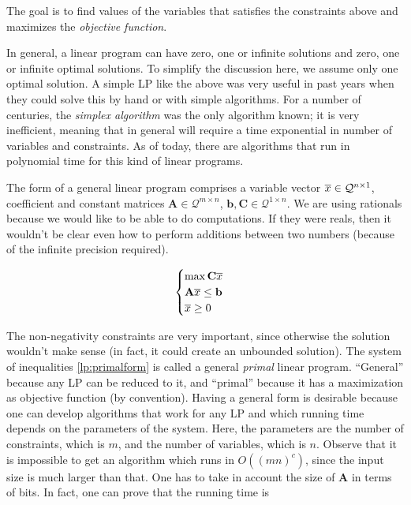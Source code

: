 The goal is to find values of the variables that satisfies the constraints above and maximizes the \emph{objective function}.

In general, a linear program can have zero, one or infinite solutions and zero, one or infinite optimal solutions. To simplify the discussion here, we assume only one optimal solution. A simple LP like the above was very useful in past years when they could solve this by hand or with simple algorithms. For a number of centuries, the \emph{simplex algorithm} was the only algorithm known; it is very inefficient, meaning that in general will require a time exponential in number of variables and constraints. As of today, there are algorithms that run in polynomial time for this kind of linear programs. 

The form of a general linear program comprises a variable vector $\overline{x} \in \mathcal{Q}^{n\times 1}$, coefficient and constant matrices $\mathbf{A} \in \mathcal{Q}^{m\times n}$,  $\mathbf{b}, \mathbf{C} \in \mathcal{Q}^{1\times n}$. We are using rationals because we would like to be able to do computations. If they were reals, then it wouldn't be clear even how to perform additions between two numbers (because of the infinite precision required).

\begin{equation}\label{lp:primalform}
\begin{cases}
\max \mathbf{C}\overline{x}\\
\mathbf{A}\overline{x} \leq \mathbf{b}\\
\overline{x} \geq 0
\end{cases}
\end{equation}

The non-negativity constraints are very important, since otherwise the solution wouldn't make sense (in fact, it could create an unbounded solution). The system of inequalities \ref{lp:primalform} is called a general \emph{primal} linear program. ``General'' because any LP can be reduced to it, and ``primal'' because it has a maximization as objective function (by convention). Having a general form is desirable because one can develop algorithms that work for any LP and which running time depends on the parameters of the system. Here, the parameters are the number of constraints, which is $m$, and the number of variables, which is $n$. Observe that it is impossible to get an algorithm which runs in $O((mn)^c)$, since the input size is much larger than that. One has to take in account the size of $\mathbf{A}$ in terms of bits. In fact, one can prove that the running time is 

